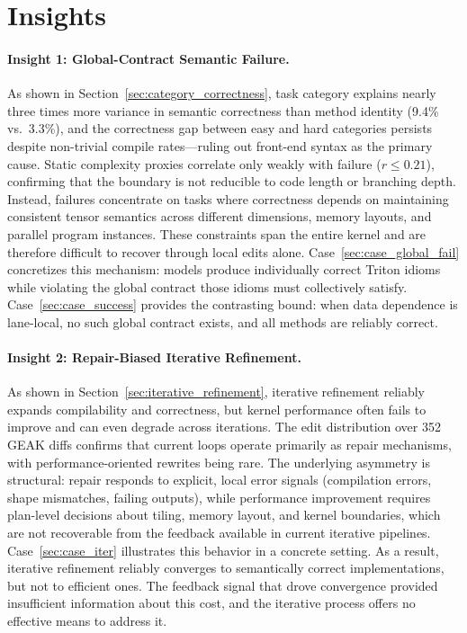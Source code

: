 \section{Insights} \label{Sec:Insights}

\paragraph{Insight 1: Global-Contract Semantic Failure.}
As shown in Section~\ref{sec:category_correctness}, task category explains nearly three times more variance in semantic correctness than method identity (9.4\% vs.\ 3.3\%), and the correctness gap between easy and hard categories persists despite non-trivial compile rates---ruling out front-end syntax as the primary cause. Static complexity proxies correlate only weakly with failure ($r \leq 0.21$), confirming that the boundary is not reducible to code length or branching depth.
Instead, failures concentrate on tasks where correctness depends on maintaining consistent tensor semantics across different dimensions, memory layouts, and parallel program instances. These constraints span the entire kernel and are therefore difficult to recover through local edits alone.
Case~\ref{sec:case_global_fail} concretizes this mechanism: models produce individually correct Triton idioms while violating the global contract those idioms must collectively satisfy. 
Case~\ref{sec:case_success} provides the contrasting bound: when data dependence is lane-local, no such global contract exists, and all methods are reliably correct.


\paragraph{Insight 2: Repair-Biased Iterative Refinement.}
\label{sec:insight2}

As shown in Section~\ref{sec:iterative_refinement}, iterative refinement reliably expands compilability and correctness, but kernel performance often fails to improve and can even degrade across iterations.
The edit distribution over 352 GEAK diffs confirms that current loops operate primarily as repair mechanisms, with performance-oriented rewrites being rare.
The underlying asymmetry is structural: repair responds to explicit, local error signals (compilation errors, shape mismatches, failing outputs), while performance improvement requires plan-level decisions about tiling, memory layout, and kernel boundaries, which are not recoverable from the feedback available in current iterative pipelines. Case~\ref{sec:case_iter} illustrates this behavior in a concrete setting. As a result, iterative refinement reliably converges to semantically correct implementations, but not to efficient ones. The feedback signal that drove convergence provided insufficient information about this cost, and the iterative process offers no effective means to address it.

